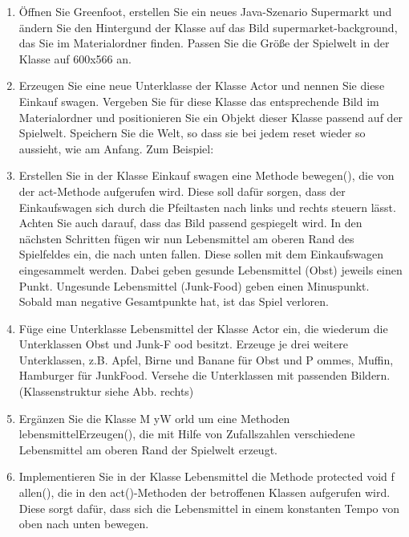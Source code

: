 \documentclass{lehramt-informatik-haupt}
\begin{document}
\begin{enumerate}


\item Öffnen Sie Greenfoot, erstellen Sie ein neues Java-Szenario
Supermarkt und ändern Sie den Hintergund der Klasse  auf
das Bild supermarket-background, das Sie im Materialordner finden.
Passen Sie die Größe der Spielwelt in der Klasse  auf
600x566 an.


\item Erzeugen Sie eine neue Unterklasse der Klasse Actor und nennen Sie
diese Einkauf swagen. Vergeben Sie für diese Klasse das entsprechende
Bild im Materialordner und positionieren Sie ein Objekt dieser Klasse
passend auf der Spielwelt. Speichern Sie die Welt, so dass sie bei jedem
reset wieder so aussieht, wie am Anfang. Zum Beispiel:


\item Erstellen Sie in der Klasse Einkauf swagen eine Methode bewegen(),
die von der act-Methode aufgerufen wird. Diese soll dafür sorgen, dass
der Einkaufswagen sich durch die Pfeiltasten nach links und rechts
steuern lässt. Achten Sie auch darauf, dass das Bild passend gespiegelt
wird. In den nächsten Schritten fügen wir nun Lebensmittel am oberen
Rand des Spielfeldes ein, die nach unten fallen. Diese sollen mit dem
Einkaufswagen eingesammelt werden. Dabei geben gesunde Lebensmittel
(Obst) jeweils einen Punkt. Ungesunde Lebensmittel (Junk-Food) geben
einen Minuspunkt. Sobald man negative Gesamtpunkte hat, ist das Spiel
verloren.


\item Füge eine Unterklasse Lebensmittel der Klasse Actor ein, die
wiederum die Unterklassen Obst und Junk-F ood besitzt. Erzeuge je drei
weitere Unterklassen, z.B. Apfel, Birne und Banane für Obst und P
ommes, Muffin, Hamburger für JunkFood. Versehe die Unterklassen mit
passenden Bildern. (Klassenstruktur siehe Abb. rechts)


\item Ergänzen Sie die Klasse M yW orld um eine Methoden
lebensmittelErzeugen(), die mit Hilfe von Zufallszahlen verschiedene
Lebensmittel am oberen Rand der Spielwelt erzeugt.


\item Implementieren Sie in der Klasse Lebensmittel die Methode
protected void f allen(), die in den act()-Methoden der betroffenen
Klassen aufgerufen wird. Diese sorgt dafür, dass sich die Lebensmittel
in einem konstanten Tempo von oben nach unten bewegen.


\end{enumerate}
\end{document}
